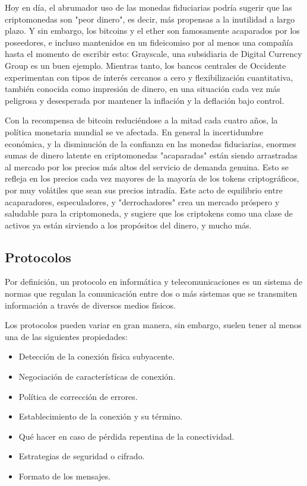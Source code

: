 Hoy en día, el abrumador uso de las monedas fiduciarias podría sugerir que
las criptomonedas son "peor dinero", es decir, más propensas a la inutilidad a largo plazo.
Y sin embargo, los bitcoins y el ether son famosamente acaparados por los poseedores, e incluso
mantenidos en un fideicomiso por al menos una compañía hasta el momento de escribir esto:
Grayscale, una subsidiaria de Digital Currency Group es un buen ejemplo.
Mientras tanto, los bancos centrales de Occidente experimentan con tipos de interés cercanos a cero
y flexibilización cuantitativa, también conocida como impresión de dinero, en una situación cada
vez más peligrosa y desesperada por mantener la inflación y la deflación bajo control.

Con la recompensa de bitcoin reduciéndose a la mitad cada cuatro años, la política monetaria
mundial se ve afectada. En general la incertidumbre económica, y la disminución de la confianza en
las monedas fiduciarias, enormes sumas de dinero latente en criptomonedas "acaparadas" están siendo
arrastradas al mercado por los precios más altos del servicio de demanda genuina. Esto se refleja
en los precios cada vez mayores de la mayoría de los tokens criptográficos, por muy volátiles que
sean sus precios intradía. Este acto de equilibrio entre acaparadores, especuladores, y
"derrochadores" crea un mercado próspero y saludable para la criptomoneda, y sugiere que
los criptokens como una clase de activos ya están sirviendo a los propósitos del dinero, y mucho
más.


\subsection{Protocolos}
Por definición, un protocolo en informática y telecomunicaciones es un sistema de normas que
regulan la comunicación entre dos o más sistemas que se transmiten información a través de 
diversos medios físicos.

Los protocolos pueden variar en gran manera, sin embargo, suelen tener al menos una de las 
siguientes propiedades:

\begin{itemize}
\item Detección de la conexión física subyacente.
\item Negociación de características de conexión.
\item Política de corrección de errores.
\item Establecimiento de la conexión y su término.
\item Qué hacer en caso de pérdida repentina de la conectividad.
\item Estrategias de seguridad o cifrado.
\item Formato de los mensajes.
\end{itemize}


